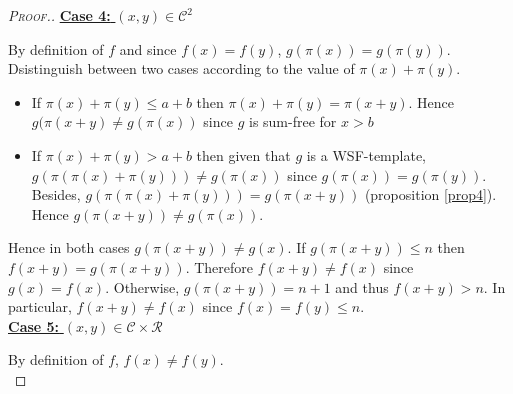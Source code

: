 \begin{proof}[\textsc{Proof.}]
\noindent \underline{\textbf{Case 4:} \((x,y) \in \mathcal{C}^2\)}
\par
By definition of \(f\) and since \(f(x)=f(y)\), \(g(\pi(x)) = g(\pi(y))\). Dsistinguish between two cases according 
to the value of \(\pi(x)+\pi(y)\).
\begin{itemize}
\item If \(\pi(x) + \pi(y) \leqslant a+b\) then \(\pi(x)+\pi(y) = \pi(x + y)\). Hence \(g(\pi(x + y) \neq g(\pi(x))\) since 
	\(g\) is sum-free for \(x>b\)
\item \begin{sloppypar} 
	If \(\pi(x)+\pi(y)>a+b\) then given that \(g\) is a WSF-template, \({g(\pi(\pi(x)+\pi(y))) \neq g(\pi(x))}\) since 
	\({g(\pi(x)) = g(\pi(y))}\). Besides,  \({g(\pi(\pi(x)+\pi(y))) = g(\pi(x + y))}\) (proposition \ref{prop4}). Hence \({g(\pi(x + y)) 
	\neq  g(\pi(x))}\).
	\end{sloppypar}
\end{itemize}
\par
Hence in both cases \(g(\pi(x+y)) \neq g(x)\). If  \(g(\pi(x+y)) \leqslant n\) then \(f(x+y) = g(\pi(x+y))\). Therefore 
\(f(x+y) \neq f(x)\) since \(g(x) = f(x)\). Otherwise, \(g(\pi(x+y)) = n + 1\) and thus \(f(x+y) > n\). In particular, 
\(f(x + y) \neq f(x)\) since \(f(x) = f(y) \leqslant n\). \\

\noindent \underline{\textbf{Case 5:} \((x,y) \in \mathcal{C} \times \mathcal{R}\)}
\par
By definition of \(f\), \(f(x) \neq f(y)\).\\


\end{proof}
